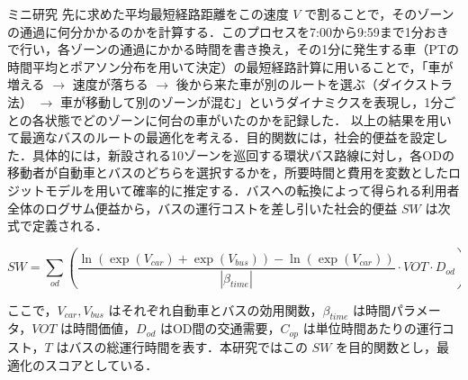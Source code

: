 \begin{column}{ミニ研究}
先に求めた平均最短経路距離をこの速度 $V$ で割ることで，そのゾーンの通過に何分かかるのかを計算する．このプロセスを7:00から9:59まで1分おきで行い，各ゾーンの通過にかかる時間を書き換え，その1分に発生する車（PTの時間平均とポアソン分布を用いて決定）の最短経路計算に用いることで，「車が増える $\to$ 速度が落ちる $\to$ 後から来た車が別のルートを選ぶ（ダイクストラ法） $\to$ 車が移動して別のゾーンが混む」というダイナミクスを表現し，1分ごとの各状態でどのゾーンに何台の車がいたのかを記録した．
以上の結果を用いて最適なバスのルートの最適化を考える．目的関数には，社会的便益を設定した．具体的には，新設される10ゾーンを巡回する環状バス路線に対し，各ODの移動者が自動車とバスのどちらを選択するかを，所要時間と費用を変数としたロジットモデルを用いて確率的に推定する．バスへの転換によって得られる利用者全体のログサム便益から，バスの運行コストを差し引いた社会的便益 $SW$ は次式で定義される．

\begin{equation}
  SW = \sum_{od} \left( \frac{\ln(\exp(V_{car}) + \exp(V_{bus})) - \ln(\exp(V_{car}))}{|\beta_{time}|} \cdot VOT \cdot D_{od} \right) - C_{op} \cdot T .
  \label{eq:social_welfare}
\end{equation}

ここで，$V_{car}, V_{bus}$ はそれぞれ自動車とバスの効用関数，$\beta_{time}$ は時間パラメータ，$VOT$ は時間価値，$D_{od}$ はOD間の交通需要，$C_{op}$ は単位時間あたりの運行コスト，$T$ はバスの総運行時間を表す．本研究ではこの $SW$ を目的関数とし，最適化のスコアとしている．


\end{column}
